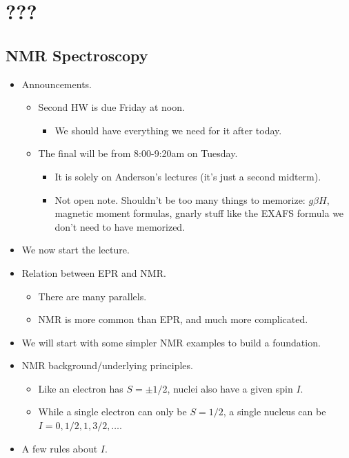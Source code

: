 \documentclass[../notes.tex]{subfiles}
\begin{document}
\chapter{???}
\section{NMR Spectroscopy}
\begin{itemize}
    \item {}Announcements.
    \begin{itemize}
        \item Second HW is due Friday at noon.
        \begin{itemize}
            \item We should have everything we need for it after today.
        \end{itemize}
        \item The final will be from 8:00-9:20am on Tuesday.
        \begin{itemize}
            \item It is solely on Anderson's lectures (it's just a second midterm).
            \item Not open note. Shouldn't be too many things to memorize: $g\beta H$, magnetic moment formulas, gnarly stuff like the EXAFS formula we don't need to have memorized.
        \end{itemize}
    \end{itemize}
    \item We now start the lecture.
    \item Relation between EPR and NMR.
    \begin{itemize}
        \item There are many parallels.
        \item NMR is more common than EPR, and much more complicated.
    \end{itemize}
    \item We will start with some simpler NMR examples to build a foundation.
    \item NMR background/underlying principles.
    \begin{itemize}
        \item Like an electron has $S=\pm 1/2$, nuclei also have a given spin $I$.
        \item While a single electron can only be $S=1/2$, a single nucleus can be $I=0,1/2,1,3/2,\dots$.
    \end{itemize}
    \item A few rules about $I$.

\end{itemize}
\end{document}
